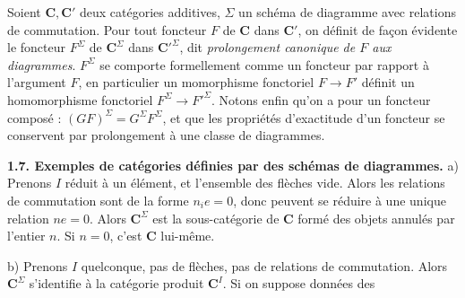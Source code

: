 Soient $\mathbf{C},\mathbf{C}'$ deux catégories additives, $\Sigma$ un schéma de diagramme avec
relations de commutation. Pour tout foncteur $F$ de $\mathbf{C}$ dans $\mathbf{C}'$, on définit
de façon évidente le foncteur $F^\Sigma$ de $\mathbf{C}^\Sigma$ dans $\mathbf{C}'^\Sigma$, dit
\textit{prolongement canonique de $F$ aux diagrammes}. $F^\Sigma$ se comporte
formellement comme un foncteur par rapport à l'argument $F$, en particulier un
momorphisme fonctoriel $F\to F'$ définit un homomorphisme
fonctoriel $F^\Sigma\to F'^\Sigma$. Notons enfin qu'on a pour un
foncteur composé : $(GF)^\Sigma=G^\Sigma F^\Sigma$, et que les propriétés d'exactitude d'un foncteur se conservent par
prolongement à une classe de diagrammes.

\textbf{1.7. Exemples de catégories définies par des schémas de
diagrammes.}
a) Prenons $I$ réduit à un élément, et l'ensemble des flèches vide.
Alors les relations de commutation sont de la forme $n_i e=0$, donc peuvent se
réduire à une unique relation $ne=0$. Alors $\mathbf{C}^\Sigma$ est la sous-catégorie de
$\mathbf{C}$ formé des objets annulés par l'entier $n$. Si $n=0$, c'est $\mathbf{C}$ lui-même.

b) Prenons $I$ quelconque, pas de flèches, pas de relations de
commutation. Alors $\mathbf{C}^\Sigma$ s'identifie à la catégorie produit $\mathbf{C}^I$. Si on
suppose données des

